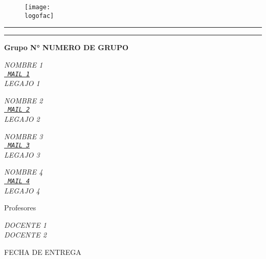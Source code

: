 
\begin{titlepage}
    \centering
    \begin{figure}[t]
        \centering
        \texttt{[image: \\logofac]}
    \end{figure}    
    {\bfseries\Large{\universidad}\par}
    \vskip 0.5cm
    {\sc\Large{\carrera}\par}
    \vskip 0.6cm
    {\sc\LARGE{\materia}\par}
    \vskip 0.75cm
    \rule{\textwidth}{0.5pt}
    \vskip 0.5cm
    {\Large{\unidad}\par}
    \vskip 0.35cm
    {\bfseries\LARGE{\titulo}\par}
    \vskip 0.5cm
    \rule{\textwidth}{0.5pt}
    
    \vskip 1cm   
    
    {\bfseries\Large{Grupo N° NUMERO DE GRUPO}\par}
    \vskip 1cm 
    \begin{center}
        \begin{minipage}[b]{0.49\textwidth}
        \centering \slshape
            NOMBRE 1\\[0.3ex]
            \href{mailto:	MAIL1}{\texttt{ MAIL 1}}\\[0.3ex]
            LEGAJO 1
        \end{minipage}
        \begin{minipage}[b]{0.49\textwidth}
        \centering \slshape
            NOMBRE 2\\[0.3ex]
            \href{mailto:	MAIL2}{\texttt{ MAIL 2}}\\[0.3ex]
            LEGAJO 2
        \end{minipage}
    \vskip 0.8cm
        \begin{minipage}[b]{0.49\textwidth}
        \centering \slshape
            NOMBRE 3\\[0.3ex]
            \href{mailto:	MAIL3}{\texttt{ MAIL 3}}\\[0.3ex]
            LEGAJO 3
        \end{minipage}    
        \begin{minipage}[b]{0.49\textwidth}
        \centering \slshape
            NOMBRE 4\\[0.3ex]
            \href{mailto:	MAIL4}{\texttt{ MAIL 4}}\\[0.3ex]
            LEGAJO 4
        \end{minipage}
    \end{center}
    
    \vfill
    
    {\Large{Profesores}\par}
    \begin{center}\slshape
        DOCENTE 1\\[1ex]
        DOCENTE 2\\[1ex]
    \end{center}
    \vskip 0.5cm
    {FECHA DE ENTREGA}\par
\end{titlepage}
